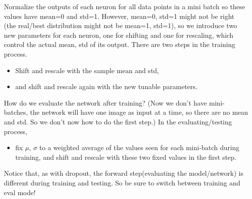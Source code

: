 Normalize the outputs of each neuron for all data points in a mini batch so these values have mean=0 and std=1.
However, mean=0, std=1 might not be right (the real/best distribution might not be mean=1, std=1), so we introduce two new parameters for each neuron, one for shifting and one for rescaling, which control the actual mean, std of its output.
There are two steps in the training process. 
\begin{itemize}
\item Shift and rescale with the sample mean and std, 
\item and shift and rescale again with the new tunable parameters.
\end{itemize}

How do we evaluate the network after training? (Now we don't have mini-batches, the network will have one image as input at a time, so there are no mean and std. So we don't now how to do the first step.) In the evaluating/testing process,
\begin{itemize}
\item fix $\mu$, $\sigma$ to a weighted average of the values seen for each mini-batch during training, and shift and rescale with these two fixed values in the first step.
\end{itemize}

Notice that, as with dropout, the forward step(evaluating the model/network) is different during training and testing.
So be sure to switch between training and eval mode!

